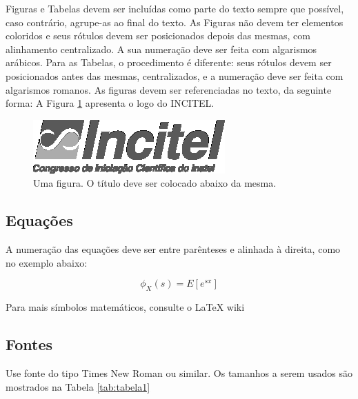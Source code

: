Figuras e Tabelas devem ser incluídas como parte do texto sempre que possível, caso contrário, agrupe-as ao final do texto. As Figuras não devem ter elementos coloridos e seus rótulos devem ser posicionados depois das mesmas, com alinhamento centralizado. A sua numeração deve ser feita com algarismos arábicos. Para as Tabelas, o procedimento é diferente: seus rótulos devem ser posicionados antes das mesmas, centralizados, e a numeração deve ser feita com algarismos romanos. As figuras devem ser referenciadas no texto, da seguinte forma: A Figura \ref{fig:incitel} apresenta o logo do INCITEL.

\begin{figure}[h]
    \centering
    \includegraphics{figuras/logo_incitel.eps}
    \caption{Uma figura. O título deve ser colocado abaixo da mesma.}
    \label{fig:incitel}
\end{figure}

\subsection{Equações}
A numeração das equações deve ser entre parênteses e alinhada à direita, como no exemplo abaixo:

\begin{equation}
\label{eq:mgf}
\phi_X(s)=E[e^{sx}]
\end{equation}

Para mais símbolos matemáticos, consulte o LaTeX wiki \cite{latexMath}

\subsection{Fontes}

Use fonte do tipo Times New Roman ou similar. Os tamanhos a serem usados são mostrados na Tabela \ref{tab:tabela1}

